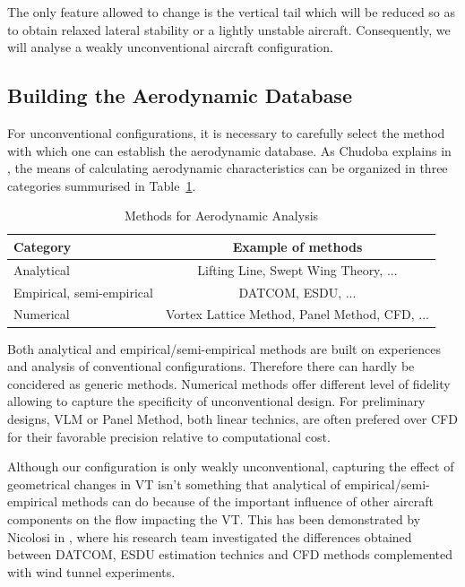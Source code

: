 The only feature allowed to change is the vertical tail which will be reduced so as to obtain relaxed lateral stability or a lightly unstable aircraft. Consequently, we will analyse a weakly unconventional aircraft configuration.

\subsection{Building the Aerodynamic Database}
For unconventional configurations, it is necessary to carefully select the method with which one can establish the aerodynamic database. As Chudoba explains in \cite{ChudobaUnconventionalConf}, the means of calculating aerodynamic characteristics can be organized in three categories summurised in Table~\ref{tab:aeroAnalysis}.
\begin{table}[hbt!]
	\caption{\label{tab:aeroAnalysis} Methods for Aerodynamic Analysis \cite{Chudoba_generic_method}}
	\centering
	\begin{tabular}{l|c}
		Category & Example of methods\\
		\hline
		Analytical & Lifting Line, Swept Wing Theory, ...\\
		Empirical, semi-empirical & DATCOM, ESDU, ...\\ 
		Numerical & Vortex Lattice Method, Panel Method, CFD, ...\\
	\end{tabular}
\end{table}

Both analytical and empirical/semi-empirical methods are built on experiences and analysis of conventional configurations. Therefore there can hardly be concidered as generic methods. Numerical methods offer different level of fidelity allowing to capture the specificity of unconventional design. For preliminary designs, VLM or Panel Method, both linear technics, are often prefered over CFD for their favorable precision relative to computational cost.

Although our configuration is only weakly unconventional, capturing the effect of geometrical changes in VT isn't something that analytical of empirical/semi-empirical methods can do because of the important influence of other aircraft components on the flow impacting the VT. This has been demonstrated by Nicolosi in \cite{NicolosiInvestigationVertical}, where his research team investigated the differences obtained between DATCOM, ESDU estimation technics and CFD methods complemented with wind tunnel experiments.

